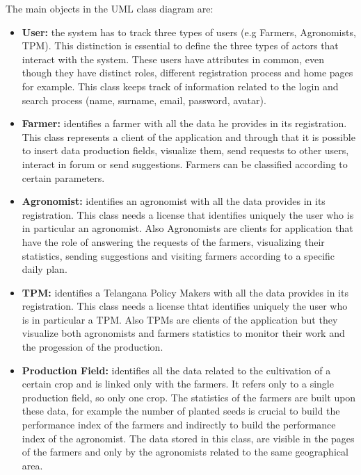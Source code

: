 	The main objects in the UML class diagram are:
	\begin{itemize}
		\item \textbf{User:} the system has to track three types of users (e.g Farmers, Agronomists, TPM). This distinction is essential to define the three types of actors that interact with the system. These users have attributes in common, even though they have distinct roles, different registration process and home pages for example. This class keeps track of information related to the login and search process (name, surname, email, password, avatar).
		
		\item \textbf{Farmer:} identifies a farmer with all the data he provides in its registration. This class represents a client of the application and through that it is possible to insert data production fields, visualize them, send requests to other users, interact in forum or send suggestions. Farmers can be classified according to certain parameters.
		
		\item \textbf{Agronomist:} identifies an agronomist with all the data provides in its registration. This class needs a license that identifies uniquely the user who is in particular an agronomist. Also Agronomists are clients for application that have the role of answering the requests of the farmers, visualizing their statistics, sending suggestions and visiting farmers according to a specific daily plan. 
		
		\item \textbf{TPM:} identifies a Telangana Policy Makers with all the data provides in its registration. This class needs a license thtat identifies uniquely the user who is in particular a TPM. Also TPMs are clients of the application but they visualize both agronomists and farmers statistics to monitor their work and the progession of the production.  
		
		\item \textbf{Production Field:} identifies all the data related to the cultivation of a certain crop and is linked only with the farmers. It refers only to a single production field, so only one crop. The statistics of the farmers are built upon these data, for example the number of planted seeds is crucial to build the performance index of the farmers and indirectly to build the performance index of the agronomist. The data stored in this class, are visible in the pages of the farmers and only by the agronomists related to the same geographical area.  
		

\end{itemize}
